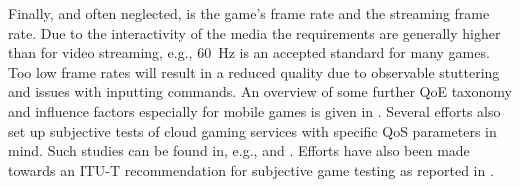 Finally, and often neglected, is the game's frame rate and the streaming frame rate. Due to the interactivity of the media the requirements are generally higher than for video streaming, e.g., \SI{60}{\hertz} is an accepted standard for many games. Too low frame rates will result in a reduced quality due to observable stuttering and issues with inputting commands.
An overview of some further \gls{QoE} taxonomy and influence factors especially for mobile games is given in \cite{beyer2014typedisplaydelayimpact}. Several efforts also set up subjective tests of cloud gaming services with specific \gls{QoS} parameters in mind. Such studies can be found in, e.g., \cite{Jarschel20132883} and  \cite{6614351}. Efforts have also been made towards an \acrshort{ITU-T} recommendation for subjective game testing as reported in \cite{mollertowards}.



%
%






